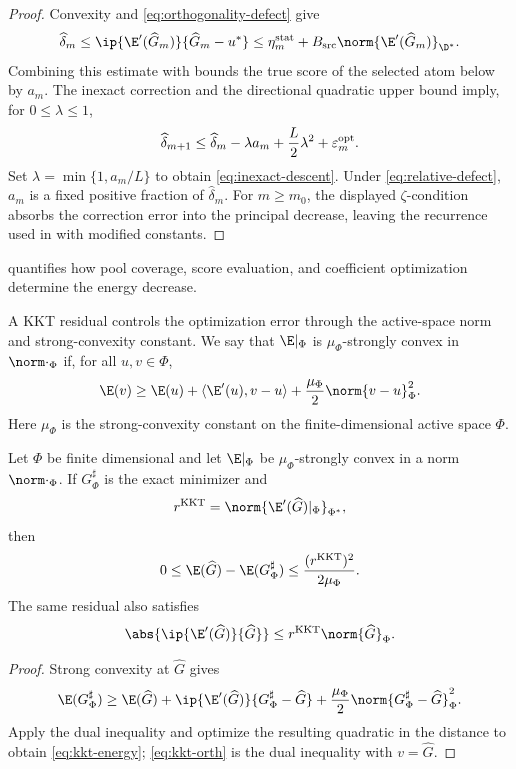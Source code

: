 \begin{proof}
Convexity and \cref{eq:orthogonality-defect} give
\[
 \widehat\delta_m
 \leq\ip{\E'(\widehat G_m)}{\widehat G_m-u^*}
 \leq\eta_m^{\rm stat}+B_{\rm src}\norm{\E'(\widehat G_m)}_{\D^*}.
\]
Combining this estimate with  bounds the true score of the selected atom below by
\(a_m\). The inexact correction and the directional quadratic upper bound imply, for
\(0\leq\lambda\leq1\),
\[
 \widehat\delta_{m+1}\leq\widehat\delta_m-\lambda a_m+\frac{L}{2}\lambda^2+\varepsilon_m^{\rm opt}.
\]
Set \(\lambda=\min\{1,a_m/L\}\) to obtain \cref{eq:inexact-descent}. Under
\cref{eq:relative-defect}, \(a_m\) is a fixed positive fraction of \(\widehat\delta_m\). For
\(m\ge m_0\), the displayed \(\zeta\)-condition absorbs the correction error into the
principal decrease, leaving the recurrence used in  with modified constants.
\end{proof}

\begin{remark}
 quantifies how pool coverage, score evaluation, and coefficient optimization determine the energy decrease.
\end{remark}

A KKT residual controls the optimization error through the active-space norm and strong-convexity constant. We say that \(\E|_\Phi\) is \(\mu_\Phi\)-strongly convex in \(\norm\cdot_\Phi\) if, for all \(u,v\in\Phi\),
\[
 \E(v)\geq \E(u)+\langle\E'(u),v-u\rangle
       +\frac{\mu_\Phi}{2}\norm{v-u}_\Phi^2 .
\]
Here \(\mu_\Phi\) is the strong-convexity constant on the finite-dimensional active space \(\Phi\).

\begin{lemma}
\label{lem:kkt}
Let \(\Phi\) be finite dimensional and let \(\E|_\Phi\) be \(\mu_\Phi\)-strongly convex in a norm
\(\norm\cdot_\Phi\). If \(G_\Phi^{\sharp}\) is the exact minimizer and
\[
 r^{\mathrm{KKT}}=\norm{\E'(\widehat G)|_\Phi}_{\Phi^*},
\]
then
\begin{equation}
 0\leq\E(\widehat G)-\E(G_\Phi^{\sharp})
 \leq\frac{(r^{\mathrm{KKT}})^2}{2\mu_\Phi}.
\label{eq:kkt-energy}
\end{equation}
The same residual also satisfies
\begin{equation}
 \abs{\ip{\E'(\widehat G)}{\widehat G}}
 \leq r^{\mathrm{KKT}}\norm{\widehat G}_\Phi.
\label{eq:kkt-orth}
\end{equation}
\end{lemma}

\begin{proof}
Strong convexity at \(\widehat G\) gives
\[
 \E(G_\Phi^{\sharp})\geq\E(\widehat G)+
 \ip{\E'(\widehat G)}{G_\Phi^{\sharp}-\widehat G}
 +\frac{\mu_\Phi}{2}\norm{G_\Phi^{\sharp}-\widehat G}_\Phi^2.
\]
Apply the dual inequality and optimize the resulting quadratic in the distance to obtain
\cref{eq:kkt-energy}; \cref{eq:kkt-orth} is the dual inequality with
\(v=\widehat G\).
\end{proof}
